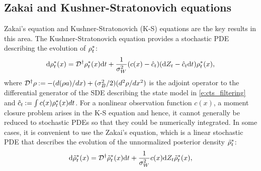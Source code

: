 \subsection{Zakai and Kushner-Stratonovich equations}
Zakai's equation \cite{zak69} and Kushner-Stratonovich (K-S) \cite{kus67, str60} equations are the key results in this area. 
The Kushner-Stratonovich equation provides a stochastic PDE describing the evolution of $\rho^*_t$:
\begin{equation}
\ud \pr^*_t(x) = \generate^\dagger \pr^*_t(x) \ud t + \frac{1}{\sigma^2_W} (c(x) - \hat{c}_t) (\ud Z_t - \hat{c}_t\ud t) \pr^*_t(x),
\label{e:kushner_stratonovich}
\end{equation}
where ${\cal D}^\dagger \rho \mathbin{:=} - (d(\rho a) / dx) + (\sigma^2_B/2) (d^2 \rho /d x^2)$ is the adjoint operator to the differential generator of the SDE describing the state model in \eqref{e:cts_filtering} and ${\hat c}_t \mathbin{:=} \int c(x) \rho^*_t(x) dt$. 
For a nonlinear observation function $c(x)$, a moment closure problem arises in the K-S equation and hence, it cannot generally be reduced to stochastic PDEs so that they could be numerically integrated. In some cases, it is convenient to use the Zakai's equation, which is a linear stochastic PDE that describes the evolution of the unnormalized posterior density $\tilde{\rho}^*_t$: 
\begin{equation}
\ud \tilde{\pr}^*_t(x) = \generate^\dagger \tilde{\pr}^*_t(x) \ud t + \frac{1}{\sigma^2_W}  c(x) \ud Z_t \tilde{\pr}^*_t(x), 
\label{e:zakai}
\end{equation}

